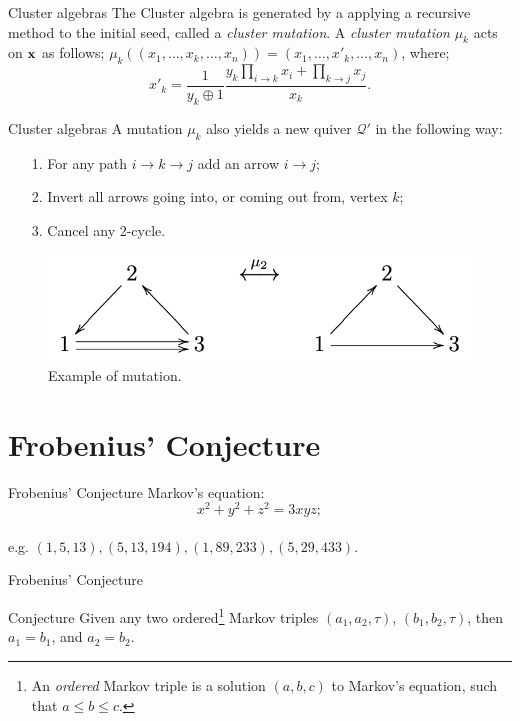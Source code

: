 \documentclass{beamer}
\begin{document}
\begin{frame}{Cluster algebras}
The Cluster algebra is generated by a applying a recursive method to the initial seed, called a \emph{cluster mutation}. A \emph{cluster mutation} $\mu_k$ acts on $\bold{x}$ as follows; $\mu_k((x_1,\dots,x_k,\dots, x_n)) = (x_1,\dots,x'_k,\dots,x_n)$, where; \pause
\begin{equation*}
    x'_k = \dfrac{1}{y_k \oplus 1}\dfrac{y_k\prod_{i \to k}x_i + \prod_{k \to j}x_j}{x_k}.
\end{equation*}
\end{frame}

\begin{frame}{Cluster algebras}
A mutation $\mu_k$ also yields a new quiver $\mathcal{Q}'$ in the following way: \pause
\begin{itemize}
    \item [1.] For any path $i \to k \to j$ add an arrow $i \to j$;\pause
    \item[2.] Invert all arrows going into, or coming out from, vertex $k$; \pause
    \item[3.] Cancel any 2-cycle.
\end{itemize}
\pause
    \begin{figure}[H]
        \centering
        \includegraphics[width = 10 cm]{Images/mutationexample.png}
        \caption{Example of mutation.}
        \label{fig:my_label}
    \end{figure}
\end{frame}
\section{Frobenius' Conjecture}
\begin{frame}{Frobenius' Conjecture}
    Markov's equation:
    \begin{equation*}
        x^2 + y^2 + z^2 = 3xyz;
    \end{equation*}
    \\
\pause
e.g. $(1, 5, 13), (5, 13, 194), (1, 89, 233), (5, 29, 433)$.
\end{frame}

\begin{frame}{Frobenius' Conjecture}
\begin{block}{Conjecture}
Given any two ordered\footnote{An \emph{ordered} Markov triple is a solution $(a,b,c)$ to Markov's equation, such that $a \leq b \leq c$.} Markov triples $(a_1,a_2,\tau)$, $(b_1,b_2,\tau)$, then $a_1 = b_1$, and $a_2 = b_2$.
\end{block}
\end{frame}
\end{document}
